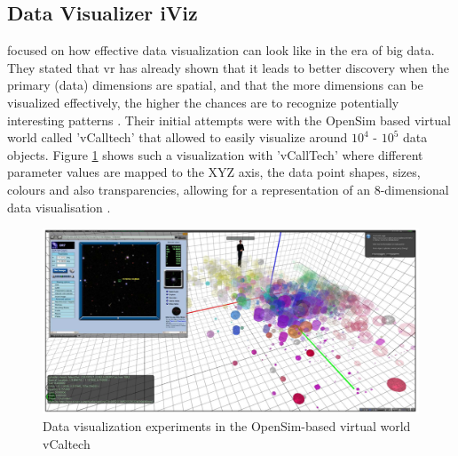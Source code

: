 
\subsection{Data Visualizer iViz}

\cite{Donalek2014} focused on how effective data visualization can look like in the era of big data. They stated that \gls{vr} has already shown that it leads to better discovery when the primary (data) dimensions are spatial, and that the more dimensions can be visualized effectively, the higher the chances are to recognize potentially interesting patterns \citep{Donalek2014}. Their initial attempts were with the OpenSim based virtual world called 'vCalltech' that allowed \cite{Donalek2014} to easily visualize around $10^{4}$ - $10^{5}$ data objects. Figure \ref{fig:caltechsim} shows such a visualization with 'vCallTech' where different parameter values are mapped to the XYZ axis, the data point shapes, sizes, colours and also transparencies, allowing for a representation of an 8-dimensional data visualisation \citep{Donalek2014}.
\begin{figure}[h]
	\begin{center}
		\includegraphics[width=14cm]{03_Figures/05_LitReview/Donalek2014_Caltech.png}
		\caption[Data visualization experiments in the OpenSim-based virtual world vCaltech]{Data visualization experiments in the OpenSim-based virtual world vCaltech \citep{Donalek2014}}
		\label{fig:caltechsim}
	\end{center}
\end{figure}

